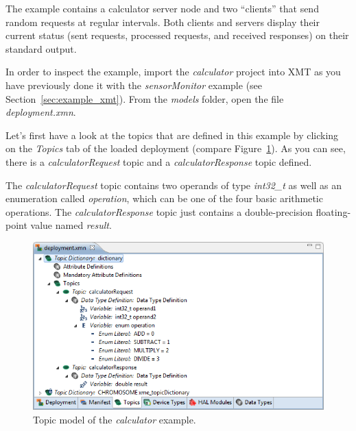 The example contains a calculator server node and two ``clients'' that send random requests at regular intervals.
Both clients and servers display their current status (sent requests, processed requests, and received responses) on their standard output.

In order to inspect the example, import the \emph{calculator} project into XMT as you have previously done it with the \emph{sensorMonitor} example
(see Section~\ref{sec:example_xmt}).
From the \emph{models} folder, open the file \emph{deployment.xmn}.

Let's first have a look at the topics that are defined in this example by clicking on the \emph{Topics} tab of the loaded deployment
(compare Figure~\ref{fig:xmt_calculator_topics}).
As you can see, there is a \emph{calculatorRequest} topic and a \emph{calculatorResponse} topic defined.

The \emph{calculatorRequest} topic contains two operands of type \emph{int32\_t} as well as an enumeration called \emph{operation},
which can be one of the four basic arithmetic operations.
%
The \emph{calculatorResponse} topic just contains a double-precision floating-point value named \emph{result}.

\begin{figure}[htpb]
	\centering
	\includegraphics[scale=0.75]{figures/xmt_calculator_topics.png}
	\caption{Topic model of the \emph{calculator} example.}
	\label{fig:xmt_calculator_topics}
\end{figure}

